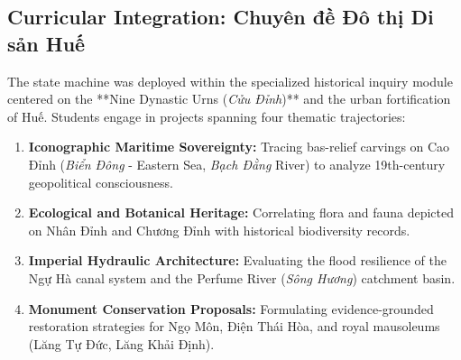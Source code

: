 \documentclass[11pt,a4paper]{article}
\begin{document}
\subsection{Curricular Integration: Chuyên đề Đô thị Di sản Huế}
The state machine was deployed within the specialized historical inquiry module centered on the **Nine Dynastic Urns (\textit{Cửu Đỉnh})** and the urban fortification of Huế. Students engage in projects spanning four thematic trajectories:
\begin{enumerate}
    \item \textbf{Iconographic Maritime Sovereignty:} Tracing bas-relief carvings on Cao Đỉnh (\textit{Biển Đông} - Eastern Sea, \textit{Bạch Đằng} River) to analyze 19th-century geopolitical consciousness.
    \item \textbf{Ecological and Botanical Heritage:} Correlating flora and fauna depicted on Nhân Đỉnh and Chương Đỉnh with historical biodiversity records.
    \item \textbf{Imperial Hydraulic Architecture:} Evaluating the flood resilience of the Ngự Hà canal system and the Perfume River (\textit{Sông Hương}) catchment basin.
    \item \textbf{Monument Conservation Proposals:} Formulating evidence-grounded restoration strategies for Ngọ Môn, Điện Thái Hòa, and royal mausoleums (Lăng Tự Đức, Lăng Khải Định).
\end{enumerate}
\end{document}
